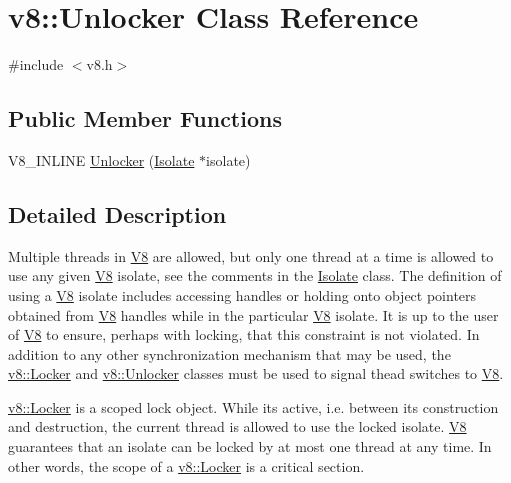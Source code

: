 \hypertarget{classv8_1_1_unlocker}{}\section{v8\+:\+:Unlocker Class Reference}
\label{classv8_1_1_unlocker}


{\ttfamily \#include $<$v8.\+h$>$}

\subsection*{Public Member Functions}
\begin{DoxyCompactItemize}
\item 
V8\+\_\+\+I\+N\+L\+I\+N\+E \hyperlink{classv8_1_1_unlocker_a2faeb117d7308b65ac85fdad390e4c1f}{Unlocker} (\hyperlink{classv8_1_1_isolate}{Isolate} $\ast$isolate)
\end{DoxyCompactItemize}


\subsection{Detailed Description}
Multiple threads in \hyperlink{classv8_1_1_v8}{V8} are allowed, but only one thread at a time is allowed to use any given \hyperlink{classv8_1_1_v8}{V8} isolate, see the comments in the \hyperlink{classv8_1_1_isolate}{Isolate} class. The definition of \textquotesingle{}using a \hyperlink{classv8_1_1_v8}{V8} isolate\textquotesingle{} includes accessing handles or holding onto object pointers obtained from \hyperlink{classv8_1_1_v8}{V8} handles while in the particular \hyperlink{classv8_1_1_v8}{V8} isolate. It is up to the user of \hyperlink{classv8_1_1_v8}{V8} to ensure, perhaps with locking, that this constraint is not violated. In addition to any other synchronization mechanism that may be used, the \hyperlink{classv8_1_1_locker}{v8\+::\+Locker} and \hyperlink{classv8_1_1_unlocker}{v8\+::\+Unlocker} classes must be used to signal thead switches to \hyperlink{classv8_1_1_v8}{V8}.

\hyperlink{classv8_1_1_locker}{v8\+::\+Locker} is a scoped lock object. While it\textquotesingle{}s active, i.\+e. between its construction and destruction, the current thread is allowed to use the locked isolate. \hyperlink{classv8_1_1_v8}{V8} guarantees that an isolate can be locked by at most one thread at any time. In other words, the scope of a \hyperlink{classv8_1_1_locker}{v8\+::\+Locker} is a critical section.

